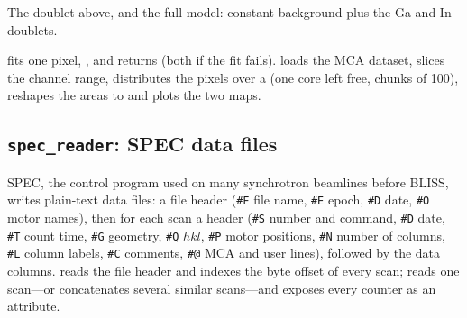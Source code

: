 The doublet above, and the full model: constant background plus the Ga and In doublets.

 fits one pixel, , and returns
 (both  if the fit fails).  loads
the MCA dataset, slices the channel range, distributes the pixels over a
 (one core left free, chunks of 100), reshapes the areas to
 and plots the two maps.

\subsection{\texttt{spec\_reader}: SPEC data files}

SPEC, the control program used on many synchrotron beamlines before BLISS, writes plain-text
data files: a file header (\texttt{\#F} file name, \texttt{\#E} epoch, \texttt{\#D} date, \texttt{\#O} motor
names), then for each scan a header (\texttt{\#S} number and command, \texttt{\#D} date, \texttt{\#T} count
time, \texttt{\#G} geometry, \texttt{\#Q} $hkl$, \texttt{\#P} motor positions, \texttt{\#N} number of columns,
\texttt{\#L} column labels, \texttt{\#C} comments, \texttt{\#@} MCA and user lines), followed by the data
columns.  reads the file header and indexes the byte offset of every scan;
 reads one scan---or concatenates several similar scans---and exposes every counter
as an attribute.

